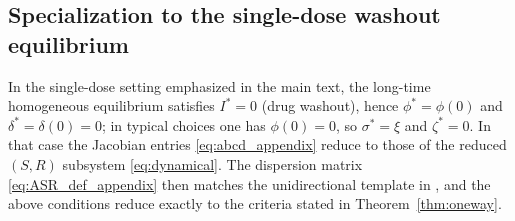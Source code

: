 \documentclass[pdflatex,sn-mathphys-ay]{sn-jnl}
\theoremstyle{thmstyleone}
\theoremstyle{definition}
\theoremstyle{remark}
\begin{document}
\begin{appendices}
\subsection{Specialization to the single-dose washout equilibrium}
In the single-dose setting emphasized in the main text, the long-time homogeneous equilibrium satisfies $I^*=0$ (drug washout), hence $\phi^*=\phi(0)$ and $\delta^*=\delta(0)=0$; in typical choices one has $\phi(0)=0$, so $\sigma^*=\xi$ and $\zeta^*=0$.  In that case the Jacobian entries \eqref{eq:abcd_appendix} reduce to those of the reduced $(S,R)$ subsystem \eqref{eq:dynamical}.  The dispersion matrix \eqref{eq:ASR_def_appendix} then matches the unidirectional template in , and the above conditions reduce exactly to the criteria stated in Theorem~\ref{thm:oneway}.

\end{appendices}


\end{document}

